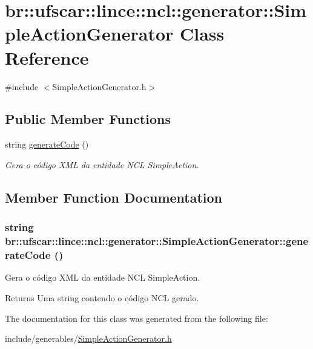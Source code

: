 \hypertarget{classbr_1_1ufscar_1_1lince_1_1ncl_1_1generator_1_1SimpleActionGenerator}{
\section{br::ufscar::lince::ncl::generator::SimpleActionGenerator Class Reference}
\label{classbr_1_1ufscar_1_1lince_1_1ncl_1_1generator_1_1SimpleActionGenerator}
}


{\ttfamily \#include $<$SimpleActionGenerator.h$>$}

\subsection*{Public Member Functions}
\begin{DoxyCompactItemize}
\item 
string \hyperlink{classbr_1_1ufscar_1_1lince_1_1ncl_1_1generator_1_1SimpleActionGenerator_a718ed78be208e8026bf986267d25e068}{generateCode} ()
\begin{DoxyCompactList}\small\item\em Gera o código XML da entidade NCL SimpleAction. \item\end{DoxyCompactList}\end{DoxyCompactItemize}


\subsection{Member Function Documentation}
\hypertarget{classbr_1_1ufscar_1_1lince_1_1ncl_1_1generator_1_1SimpleActionGenerator_a718ed78be208e8026bf986267d25e068}{
\subsubsection[{generateCode}]{\setlength{\rightskip}{0pt plus 5cm}string br::ufscar::lince::ncl::generator::SimpleActionGenerator::generateCode ()}}
\label{classbr_1_1ufscar_1_1lince_1_1ncl_1_1generator_1_1SimpleActionGenerator_a718ed78be208e8026bf986267d25e068}


Gera o código XML da entidade NCL SimpleAction. 

\begin{DoxyReturn}{Returns}
Uma string contendo o código NCL gerado. 
\end{DoxyReturn}


The documentation for this class was generated from the following file:\begin{DoxyCompactItemize}
\item 
include/generables/\hyperlink{SimpleActionGenerator_8h}{SimpleActionGenerator.h}\end{DoxyCompactItemize}
